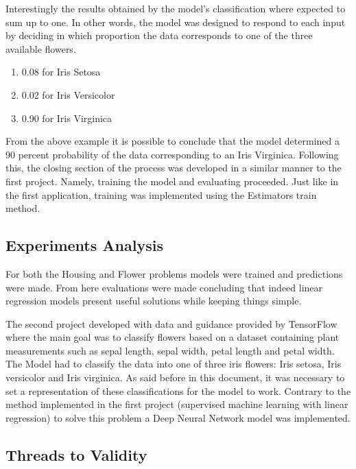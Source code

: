 Interestingly the results obtained by the model's classification where expected to sum up to one. In other words, the model was designed to respond to each input by deciding in which proportion the data corresponds to one of the three available flowers. 

\begin{enumerate}
 \item 0.08 for Iris Setosa
 \item 0.02 for Iris Versicolor
 \item 0.90 for Iris Virginica
\end{enumerate}

From the above example it is possible to conclude that the model determined a 90 percent probability of the data corresponding to an Iris Virginica.   Following this, the closing section of the process was developed in a similar manner to the first project. Namely, training the model and evaluating proceeded. Just like in the first  application, training was implemented using the Estimators train method. 

\subsection{Experiments Analysis}

For both the Housing and Flower problems models were trained and predictions were made.  From here evaluations were made concluding that indeed linear regression models present useful solutions while keeping things simple. 

The second project developed with data and guidance provided by TensorFlow where the main goal was to classify flowers based on a dataset containing plant measurements such as sepal length, sepal width, petal length and petal width. The Model had to classify the data into one of three iris flowers: Iris setosa, Iris versicolor and Iris virginica.  As said before in this document, it was necessary to set a representation of these classifications for the model to work. Contrary to the method implemented in the first project (supervised machine learning with linear regression) to solve this problem a Deep Neural Network model was implemented. 


\subsection{Threads to Validity}



\endinput



